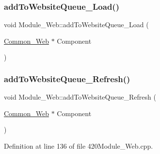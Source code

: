 \subsubsection{\texorpdfstring{add\+To\+Website\+Queue\+\_\+\+Load()}{addToWebsiteQueue\_Load()}\hspace{0.1cm}{\footnotesize\ttfamily [2/2]}}
{\footnotesize\ttfamily void Module\+\_\+\+Web\+::add\+To\+Website\+Queue\+\_\+\+Load (\begin{DoxyParamCaption}\item[{\hyperlink{class_common___web}{Common\+\_\+\+Web} $\ast$}]{Component }\end{DoxyParamCaption})}

\mbox{\label{class_module___web_aee7880f65926af22ba1b83a73607e3b6}} 
\subsubsection{\texorpdfstring{add\+To\+Website\+Queue\+\_\+\+Refresh()}{addToWebsiteQueue\_Refresh()}\hspace{0.1cm}{\footnotesize\ttfamily [1/2]}}
{\footnotesize\ttfamily void Module\+\_\+\+Web\+::add\+To\+Website\+Queue\+\_\+\+Refresh (\begin{DoxyParamCaption}\item[{\hyperlink{class_common___web}{Common\+\_\+\+Web} $\ast$}]{Component }\end{DoxyParamCaption})}



Definition at line 136 of file 420\+Module\+\_\+\+Web.\+cpp.

